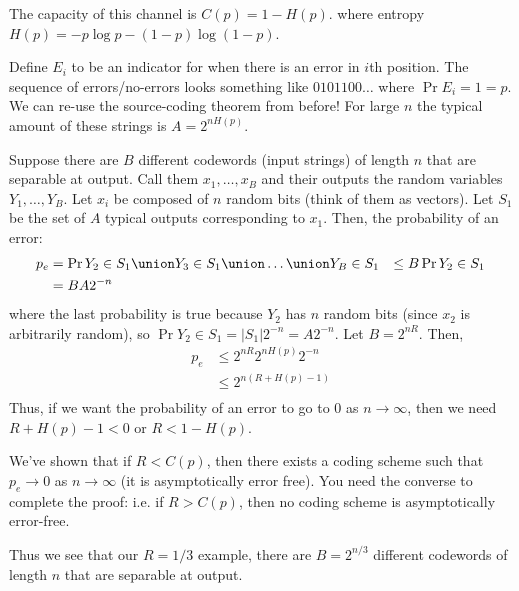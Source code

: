\begin{theorem}
    The capacity of this channel is $C(p) = 1 - H(p)$. where entropy $H(p) = -p \log p - (1 - p) \log (1- p)$.

    \begin{proof*}
        Define $E_i$ to be an indicator for when there is an error in $i$th position.
        The sequence of errors/no-errors looks something like $0101100\dots$ where $\Pr{E_i = 1} = p$.
        We can re-use the source-coding theorem from before! For large $n$ the typical amount of these strings is
        $A = 2^{nH(p)}$.

        Suppose there are $B$ different codewords (input strings) of length $n$ that are separable at output. Call them
        $x_1, \dots, x_B$ and their outputs the random variables $Y_1, \dots, Y_B$. Let $x_i$ be composed of $n$ random bits (think of them as vectors).
        Let $S_1$ be the set of $A$ typical outputs corresponding to $x_1$. Then, the probability of an error:
        \begin{align*}
            p_e &= \Pr{Y_2 \in S_1 \union Y_3 \in S_1 \union \dots \union Y_B \in S_1}
            &\leq B \Pr{Y_2 \in S_1} \\
            &= B A 2^{-n}
        \end{align*}
        where the last probability is true because $Y_2$ has $n$ random bits (since $x_2$ is arbitrarily random), so $\Pr{Y_2 \in S_1} = |S_1| 2^{-n} = A2^{-n}$.
        Let $B = 2^{nR}$. Then,
        \begin{align*}
            p_e &\leq 2^{nR} 2^{nH(p)} 2^{-n}\\
            &\leq 2^{n(R + H(p) - 1)}\\
        \end{align*}
        Thus, if we want the probability of an error to go to 0 as $n \to \infty$, then we need $R + H(p) - 1 < 0$ or $R < 1 - H(p)$.

        We've shown that if $R < C(p)$, then there exists a coding scheme such that $p_e \to 0$ as $n \to \infty$ (it is asymptotically error free).
        You need the converse to complete the proof: i.e. if $R > C(p)$, then
        no coding scheme is asymptotically error-free.
    \end{proof*}
\end{theorem}

Thus we see that our $R = 1/3$ example, there are $B = 2^{n/3}$ different codewords of length $n$ that are separable at output.

